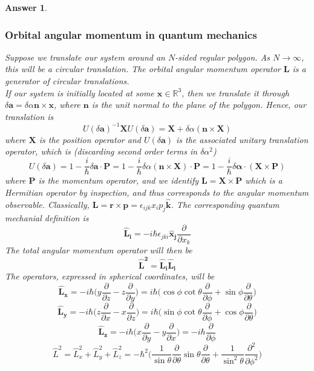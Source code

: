 \documentclass[a4paper]{article}
\newtheorem{ans}{Answer}[subsection]
\theoremstyle{new}
\begin{document}
\begin{ans}\leavevmode
\subsubsection*{Orbital angular momentum in quantum mechanics}
Suppose we translate our system around an $N$-sided regular polygon. As $N\rightarrow\infty$, this will be a circular translation. The orbital angular momentum operator $\mathbf{L}$ is a generator of circular translations.\\[5pt]
If our system is initially located at some $\mathbf{x}\in\mathbb{R}^3$, then we translate it through $\delta\mathbf{a}=\delta\alpha\mathbf{n}\times\mathbf{x}$, where $\mathbf{n}$ is the unit normal to the plane of the polygon. Hence, our translation is
$$U(\delta\mathbf{a})^{-1}\mathbf{X}U(\delta\mathbf{a})=\mathbf{X}+\delta\alpha(\mathbf{n}\times\mathbf{X})$$
where $\mathbf{X}$ is the position operator and $U(\delta\mathbf{a})$ is the associated unitary translation operator, which is (discarding second order terms in $\delta\alpha^2$)
$$U(\delta\mathbf{a})=1-\frac{i}{\hbar}\delta\mathbf{a}\cdot\mathbf{P}=1-\frac{i}{\hbar}\delta\alpha(\mathbf{n}\times\mathbf{X})\cdot\mathbf{P}=1-\frac{i}{\hbar}\delta\boldsymbol{\alpha}\cdot(\mathbf{X}\times\mathbf{P})$$
where $\mathbf{P}$ is the momentum operator, and we identify $\mathbf{L}=\mathbf{X}\times\mathbf{P}$ which is a Hermitian operator by inspection, and thus corresponds to the angular momentum observable. Classically,  $\mathbf{L}=\mathbf{r}\times\mathbf{p}=\epsilon_{ijk}x_ip_j\mathbf{\hat{k}}$. The corresponding quantum mechanial definition is
$$\mathbf{\hat{L}_i}=-i\hbar\epsilon_{jki}\mathbf{\hat{x}_j}\frac{\partial}{\partial x_k}$$ 
The total angular momentum operator will then be 
$$\mathbf{\hat{L}^2}=\mathbf{\hat{L}_i}\mathbf{\hat{L}_i}$$
The operators, expressed in spherical coordinates, will be
$$\mathbf{\hat{L}_x}=-i\hbar\bigg(y\frac{\partial}{\partial z}-z\frac{\partial}{\partial y}\bigg)=i\hbar\bigg(\cos\phi\cot\theta\frac{\partial}{\partial\phi}+\sin\phi\frac{\partial}{\partial\theta}\bigg)$$
$$\mathbf{\hat{L}_y}=-i\hbar\bigg(z\frac{\partial}{\partial x}-x\frac{\partial}{\partial z}\bigg)=i\hbar\bigg(\sin\phi\cot\theta\frac{\partial}{\partial\phi}+\cos\phi\frac{\partial}{\partial\theta}\bigg)$$
$$\mathbf{\hat{L}_z}=-i\hbar\bigg(x\frac{\partial}{\partial y}-y\frac{\partial}{\partial x}\bigg)=-i\hbar\frac{\partial}{\partial\phi}$$
$$\hat{L}^2=\hat{L}_x^2+\hat{L}_y^2+\hat{L}_z^2=-\hbar^2\bigg(\frac{1}{\sin\theta}\frac{\partial}{\partial\theta}\sin\theta\frac{\partial}{\partial\theta}+\frac{1}{\sin^2\theta}\frac{\partial^2}{\partial\phi^2}\bigg)$$

\end{ans}
\end{document}
